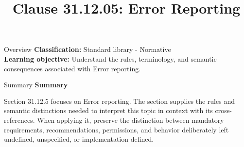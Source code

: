 \documentclass[10pt,letterpaper]{article}
\title{Clause 31.12.05: Error Reporting}
\author{}
\date{}
\begin{document}
\maketitle
\begin{CornellOverviewBox}{Overview}
\textbf{Classification:} Standard library - Normative\\[2pt]
\textbf{Learning objective:} Understand the rules, terminology, and semantic consequences associated with Error reporting.
\end{CornellOverviewBox}\begin{CornellSummaryBox}{Summary}
{\sffamily\bfseries\color{Accent} Summary}\par\vspace{3pt}Section 31.12.5 focuses on Error reporting. The section supplies the rules and semantic distinctions needed to interpret this topic in context with its cross-references. When applying it, preserve the distinction between mandatory requirements, recommendations, permissions, and behavior deliberately left undefined, unspecified, or implementation-defined.
\end{CornellSummaryBox}
\end{document}
